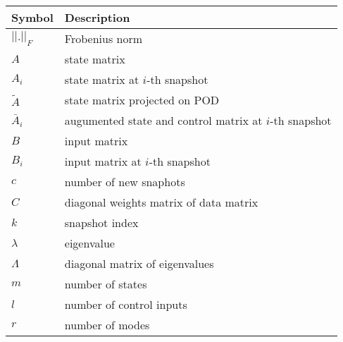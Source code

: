 \begin{longtable}{p{2cm}l}
	\toprule
	\textbf{Symbol}                & \textbf{Description}                                     \\
	\midrule
	\endhead{}
	\(|| . ||_F\)                  & Frobenius norm                                           \\
	\(A\)                          & state matrix                                             \\
	\(A_i\)                        & state matrix at \(i\)-th snapshot                        \\
	\(\tilde{A}\)                  & state matrix projected on POD                            \\
	\(\bar{A}_i\)                  & augumented state and control matrix at \(i\)-th snapshot \\
	\(B\)                          & input matrix                                             \\
	\(B_i\)                        & input matrix at \(i\)-th snapshot                        \\
	\(c\)                          & number of new snaphots                                   \\
	\(C\)                          & diagonal weights matrix of data matrix                   \\
	\(k\)                          & snapshot index                                           \\
	\(\lambda \)                   & eigenvalue                                               \\
	\(\Lambda \)                   & diagonal matrix of eigenvalues                           \\
	\(m\)                          & number of states                                         \\
	\(l\)                          & number of control inputs                                 \\
	\(r\)                          & number of modes                                          \\

\end{longtable}
